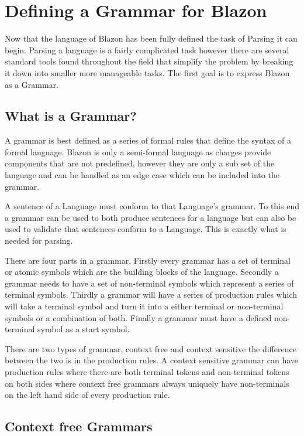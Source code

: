 \chapter{Defining a Grammar for Blazon}

Now that the language of Blazon has been fully defined the task of Parsing it can begin.  Parsing a language is a fairly complicated task however there are several standard tools found throughout the field that simplify the problem by breaking it down into smaller more manageable tasks. The first goal is to express Blazon as a Grammar. 


\section{What is a Grammar?}
A grammar is best defined as a series of formal rules that define the syntax of a formal language.  Blazon is only a semi-formal language as charges provide components that are not predefined, however they are only a sub set of the language and can be handled as an edge case which can be included into the grammar.  

A sentence of a Language must conform to that Language's grammar.  To this end a grammar can be used to both produce sentences for a language but can also be used to validate that sentences conform to a Language. This is exactly what is needed for parsing. 


There are four parts in a grammar.  Firstly every grammar has a set of terminal or atomic symbols which are the building blocks of the language.  Secondly a grammar needs to have a set of non-terminal symbols which represent a series of terminal symbols.  Thirdly a grammar will have a series of production rules which will take a terminal symbol and turn it into a either terminal or non-terminal symbols or a combination of both. Finally a grammar must have a defined non-terminal symbol as a start symbol.





There are two types of grammar, context free and context sensitive the difference between the two is in the production rules.  A context sensitive grammar can have production rules where there are both terminal tokens and non-terminal tokens on both sides where context free grammars always uniquely have non-terminals on the left hand side of every production rule. 

\section{Context free Grammars}

